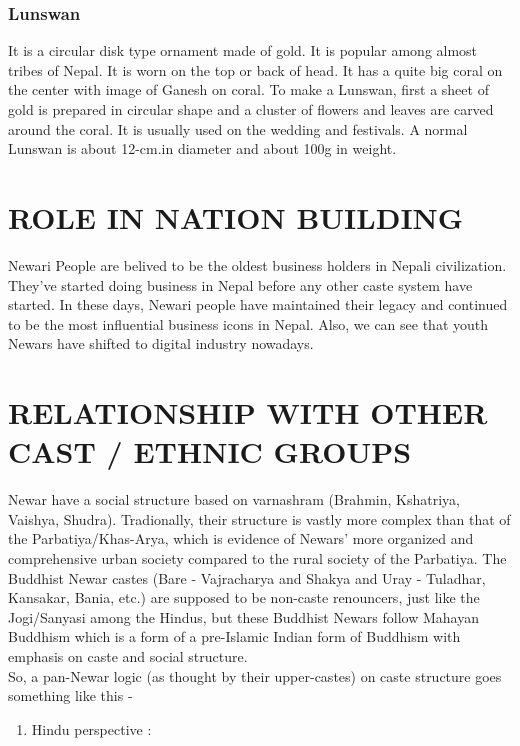 \documentclass[a4paper,13pt, margin=0.9in]{article}
\begin{document}
\begin{flushleft}
\subsubsection{Lunswan}

It is a circular disk type ornament made of gold. It is popular among almost tribes of Nepal. It is worn on the top or back of head. It has a quite big coral on the center with image of Ganesh on coral. To make a Lunswan, first a sheet of gold is prepared in circular shape and a cluster of flowers and leaves are carved around the coral. It is usually used on the wedding and festivals. A normal Lunswan is about 12-cm.in diameter and about 100g in weight.

\newpage
\section{ROLE IN NATION BUILDING}
Newari People are belived to be the oldest business holders in Nepali civilization. They've started doing business in Nepal before any other caste system have started. In these days, Newari people have maintained their legacy and continued to be the most influential business icons in Nepal. Also, we can see that youth Newars have shifted to digital industry nowadays. 

\newpage
\section{RELATIONSHIP WITH OTHER CAST / ETHNIC GROUPS}
Newar have a social structure based on varnashram (Brahmin, Kshatriya, Vaishya, Shudra). Tradionally, their structure is vastly more complex than that of the Parbatiya/Khas-Arya, which is evidence of Newars’ more organized and comprehensive urban society compared to the rural society of the Parbatiya. The Buddhist Newar castes (Bare - Vajracharya and Shakya and Uray - Tuladhar, Kansakar, Bania, etc.) are supposed to be non-caste renouncers, just like the Jogi/Sanyasi among the Hindus, but these Buddhist Newars follow Mahayan Buddhism which is a form of a pre-Islamic Indian form of Buddhism with emphasis on caste and social structure.\\ 

So, a pan-Newar logic (as thought by their upper-castes) on caste structure goes something like this -

\begin{enumerate}


    \item Hindu perspective :
    

\end{enumerate}
\end{flushleft}
\end{document}
